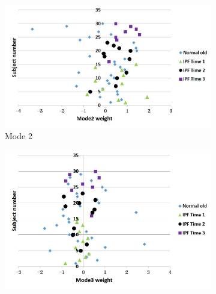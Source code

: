 \begin{figure}[htbp]
\begin{subfigure}{.65\linewidth}
  \includegraphics[width=\linewidth,trim={{.0\wd0} {.0\wd0} {.0\wd0} {.0\wd0}},clip]{QuantitativeAnalysis/Image/TimePoint_Mode2.jpg}
  \caption{Mode 2}
  \label{fig:ShapeDifference-b}
\end{subfigure}
\begin{subfigure}{.65\linewidth}%
  \includegraphics[width=\linewidth,trim={{.0\wd0} {.0\wd0} {.0\wd0} {.0\wd0}},clip]{QuantitativeAnalysis/Image/TimePoint_Mode3.jpg}

\end{subfigure}
\end{figure}
